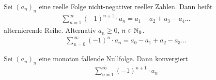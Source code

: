 
\begin{definition} %
    \marginnote{[7. Dez]}
    Sei $(a_n)_n$ eine reelle Folge nicht-negativer reeller Zahlen. Dann heißt
    \begin{align*}
        \sum_{n=1}^{\infty} (-1)^{n+1} \cdot a_n = a_1 - a_2 + a_3 - a_4 \dots
    \end{align*}
    alternierende Reihe. Alternativ $a_n\geq 0$, $n\in\mathbb{N}_0$.
    \begin{align*}
        \sum_{n=0}^{\infty} (-1)^n\cdot a_n = a_0 - a_1 + a_2 - a_3 \dots
    \end{align*}
\end{definition}

\begin{satz} %
    Sei $(a_n)_n$ eine monoton fallende Nullfolge. Dann konvergiert
    \begin{align*}
        \sum_{n=1}^{\infty} (-1)^{n+1} \cdot a_n
    \end{align*}


\end{satz}
